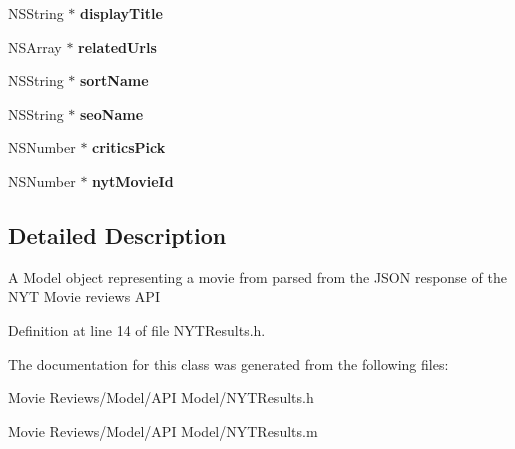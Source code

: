 \begin{DoxyCompactItemize}
\item 
N\+S\+String $\ast$ {\bfseries display\+Title}\label{interface_n_y_t_results_a654c77d089fe1bd968d7827409769df8}

\item 
N\+S\+Array $\ast$ {\bfseries related\+Urls}\label{interface_n_y_t_results_a972b5b460e376c6bd23c27619c97f373}

\item 
N\+S\+String $\ast$ {\bfseries sort\+Name}\label{interface_n_y_t_results_a09987d0ab9998d29cb2853fed4000f0f}

\item 
N\+S\+String $\ast$ {\bfseries seo\+Name}\label{interface_n_y_t_results_a56cf01b9dee97d7ba0d34c638af1143d}

\item 
N\+S\+Number $\ast$ {\bfseries critics\+Pick}\label{interface_n_y_t_results_a1cf2727a157ca99600466a941e07cd19}

\item 
N\+S\+Number $\ast$ {\bfseries nyt\+Movie\+Id}\label{interface_n_y_t_results_a5b995dc68d9cac1e8496aa0a313dc172}

\end{DoxyCompactItemize}


\subsection{Detailed Description}
A Model object representing a movie from parsed from the J\+S\+O\+N response of the N\+Y\+T Movie reviews A\+P\+I 

Definition at line 14 of file N\+Y\+T\+Results.\+h.



The documentation for this class was generated from the following files\+:\begin{DoxyCompactItemize}
\item 
Movie Reviews/\+Model/\+A\+P\+I Model/N\+Y\+T\+Results.\+h\item 
Movie Reviews/\+Model/\+A\+P\+I Model/N\+Y\+T\+Results.\+m\end{DoxyCompactItemize}
